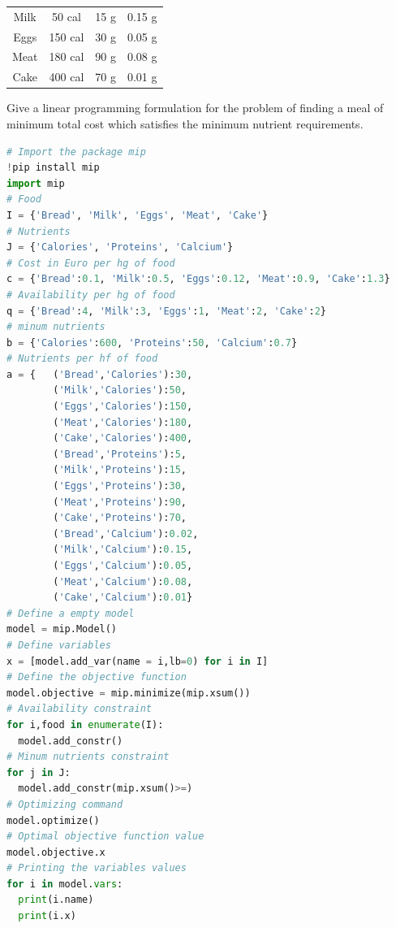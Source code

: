 \documentclass[12pt, a4paper]{report}
\newtheorem[style=M,bodystyle=\normalfont]{theorem}{Theorem}
\newtheorem[style=M,bodystyle=\normalfont]{corollary}{Corollary}
\newtheorem[style=M,bodystyle=\normalfont]{lemma}{Lemma}
\newtheorem[style=M,bodystyle=\normalfont]{definition}{Definition}
\begin{document}
\begin{Exercise}[label=a]
\begin{table}[H]
\begin{tabular}{|cccc|}
        \multicolumn{1}{|c|}{Milk}  & \multicolumn{1}{c|}{50 cal}  & \multicolumn{1}{c|}{15 g} & 0.15 g           \\
        \multicolumn{1}{|c|}{Eggs}  & \multicolumn{1}{c|}{150 cal} & \multicolumn{1}{c|}{30 g} & 0.05 g           \\
        \multicolumn{1}{|c|}{Meat}  & \multicolumn{1}{c|}{180 cal} & \multicolumn{1}{c|}{90 g} & 0.08 g           \\
        \multicolumn{1}{|c|}{Cake}  & \multicolumn{1}{c|}{400 cal} & \multicolumn{1}{c|}{70 g} & 0.01 g           \\ \hline
        \end{tabular}
    \end{table}
    Give a linear programming formulation for the problem of finding a meal of minimum total cost which satisfies the minimum nutrient requirements.
\end{Exercise}
\begin{Answer}[ref=a]
    \begin{lstlisting}[language=Python]
# Import the package mip
!pip install mip
import mip
# Food
I = {'Bread', 'Milk', 'Eggs', 'Meat', 'Cake'}
# Nutrients
J = {'Calories', 'Proteins', 'Calcium'}
# Cost in Euro per hg of food
c = {'Bread':0.1, 'Milk':0.5, 'Eggs':0.12, 'Meat':0.9, 'Cake':1.3}
# Availability per hg of food
q = {'Bread':4, 'Milk':3, 'Eggs':1, 'Meat':2, 'Cake':2}
# minum nutrients 
b = {'Calories':600, 'Proteins':50, 'Calcium':0.7}
# Nutrients per hf of food
a = {   ('Bread','Calories'):30,
        ('Milk','Calories'):50,
        ('Eggs','Calories'):150,
        ('Meat','Calories'):180,
        ('Cake','Calories'):400,
        ('Bread','Proteins'):5,
        ('Milk','Proteins'):15,
        ('Eggs','Proteins'):30,
        ('Meat','Proteins'):90,
        ('Cake','Proteins'):70,
        ('Bread','Calcium'):0.02,
        ('Milk','Calcium'):0.15,
        ('Eggs','Calcium'):0.05,
        ('Meat','Calcium'):0.08,
        ('Cake','Calcium'):0.01}
# Define a empty model
model = mip.Model()
# Define variables
x = [model.add_var(name = i,lb=0) for i in I]
# Define the objective function
model.objective = mip.minimize(mip.xsum())
# Availability constraint
for i,food in enumerate(I):
  model.add_constr()
# Minum nutrients constraint
for j in J:
  model.add_constr(mip.xsum()>=)
# Optimizing command
model.optimize()
# Optimal objective function value
model.objective.x
# Printing the variables values
for i in model.vars:
  print(i.name)
  print(i.x)
    \end{lstlisting}
\end{Answer}

\newpage
\end{document}

